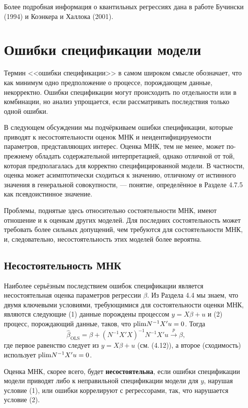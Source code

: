 Более подробная информация о квантильных регрессиях дана в работе Бучински (1994) и Коэнкера и Халлока (2001).

\section{Ошибки спецификации модели}

Термин <<ошибки спецификации>> в самом широком смысле обозначает, что как минимум одно предположение о процессе, порождающем данные, некорректно. Ошибки спецификации могут происходить по отдельности или в комбинации, но анализ упрощается, если рассматривать последствия только одной ошибки.

В следующем обсуждении мы подчёркиваем ошибки спецификации, которые приводят к несостоятельности оценок МНК и неидентифицируемости параметров, представляющих интерес. Оценка МНК, тем не менее, может по-прежнему обладать содержательной интерпретацией, однако отличной от той, которая предполагалась для корректно специфицированной модели. В частности, оценка может асимптотически сходиться к значению, отличному от истинного значения в генеральной совокупности, --- понятие, определённое в Разделе 4.7.5 как псевдоистинное значение.

Проблемы, поднятые здесь относительно состоятельности МНК, имеют отношение и к оценкам других моделей. Для последних состоятельность может требовать более сильных допущений, чем требуются для состоятельности МНК, и, следовательно, несостоятельность этих моделей более вероятна. 

\subsection{Несостоятельность МНК}

Наиболее серьёзным последствием ошибок спецификации является несостоятельная оценка параметров регрессии $\beta$. Из Раздела 4.4 мы знаем, что двумя ключевыми условиями, требующимися для состоятельности оценки МНК, являются следующие (1) данные порождены процессом $y = X\beta+u$ и (2) процесс, порождающий данные, таков, что $\mathrm{plim } N^{-1}X'u=0$. Тогда
\begin{equation}
\hat{\beta}_{\text{OLS}}=\beta + (N^{-1}X'X)^{-1}N^{-1}X'u \xrightarrow{p} \beta,
\end{equation}
где первое равенство следует из  $y = X\beta+u$ (см. (4.12)), а второе (сходимость) использует $\mathrm{plim } N^{-1}X'u=0$.

Оценка МНК, скорее всего, будет \textbf{несостоятельна}, если ошибки спецификации модели приводят либо к неправильной спецификации модели для $y$, нарушая условие (1), или ошибки коррелируют с регрессорами, так, что нарушается условие (2).


